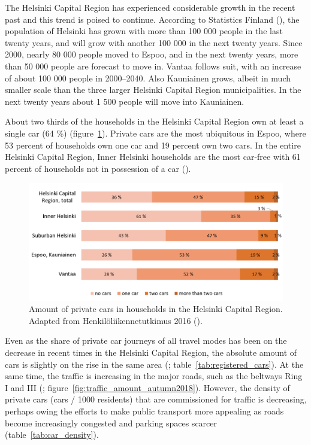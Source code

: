 The Helsinki Capital Region has experienced considerable growth in the recent past and this trend is poised to continue. According to Statistics Finland (\citeyear{StatisticsFinland2020c}), the population of Helsinki has grown with more than 100 000 people in the last twenty years, and will grow with another 100 000 in the next twenty years. Since 2000, nearly 80 000 people moved to Espoo, and in the next twenty years, more than 50 000 people are forecast to move in. Vantaa follows suit, with an increase of about 100 000 people in 2000--2040. Also Kauniainen grows, albeit in much smaller scale than the three larger Helsinki Capital Region municipalities. In the next twenty years about 1 500 people will move into Kauniainen.

About two thirds of the households in the Helsinki Capital Region own at least a single car (64 \%) (figure~\ref{fig:cars_per_household}). Private cars are the most ubiquitous in Espoo, where 53 percent of households own one car and 19 percent own two cars. In the entire Helsinki Capital Region, Inner Helsinki households are the most car-free with 61 percent of households not in possession of a car (\cite{Liikennevirasto2018}).

\begin{figure}[H]%
    \includegraphics[width=\textwidth]{images/hlt_cars_per_household.png}
    \caption[The number of private cars in households in the Helsinki Capital Region]{Amount of private cars in households in the Helsinki Capital Region. Adapted from Henkilöliikennetutkimus 2016 (\cite{Liikennevirasto2018}).}%
    \label{fig:cars_per_household}%
\end{figure}

Even as the share of private car journeys of all travel modes has been on the decrease in recent times in the Helsinki Capital Region, the absolute amount of cars is slightly on the rise in the same area (\cite{Brandt2019}; table~\ref{tab:registered_cars}). At the same time, the traffic is increasing in the major roads, such as the beltways Ring I and III (\cite{Helsinginseudunliikenne2020}; figure~\ref{fig:traffic_amount_autumn2018}). However, the density of private cars (cars / 1000 residents) that are commissioned for traffic is decreasing, perhaps owing the efforts to make public transport more appealing as roads become increasingly congested and parking spaces scarcer (table~\ref{tab:car_density}).

